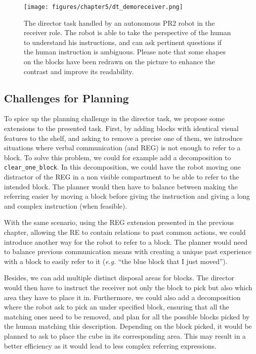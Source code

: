 \documentclass[a4paper,11pt,twoside]{StyleThese}
\begin{document}
\begin{figure}[hbtp]
\centering
\texttt{[image: figures/chapter5/dt\_demoreceiver.png]}
\caption{The director task handled by an autonomous PR2 robot in the receiver role. The robot is able to take the perspective of the human to understand his instructions, and can ask pertinent questions if the human instruction is ambiguous. Please note that some shapes on the blocks have been redrawn on the picture to enhance the contrast and improve its readability.}
\label{fig:chap5dtdemoreceiver}
\end{figure}

\subsection{Challenges for Planning}
To spice up the planning challenge in the director task, we propose some extensions to the presented task.
First, by adding blocks with identical visual features to the shelf, and asking to remove a precise one of them, we introduce situations where verbal communication (and REG) is not enough to refer to a block. To solve this problem, we could for example add a decomposition to \verb'clear_one_block'. In this decomposition, we could have the robot moving one distractor of the REG in a non visible compartment to be able to refer to the intended block. The planner would then have to balance between making the referring easier by moving a block before giving the instruction and giving a long and complex instruction (when feasible).

With the same scenario, using the REG extension presented in the previous chapter, allowing the RE to contain relations to past common actions, we could introduce another way for the robot to refer to a block. The planner would need to balance previous communication means with creating a unique past experience with a block to easily refer to it (\textit{e.g.} ``the blue block that I just moved'').

Besides, we can add multiple distinct disposal areas for blocks. The director would then have to instruct the receiver not only the block to pick but also which area they have to place it in. Furthermore, we could also add a decomposition where the robot ask to pick an under specified block, ensuring that all the matching ones need to be removed, and plan for all the possible blocks picked by the human matching this description. Depending on the block picked, it would be planned to ask to place the cube in its corresponding area. This may result in a better efficiency as it would lead to less complex referring expressions.
\end{document}
